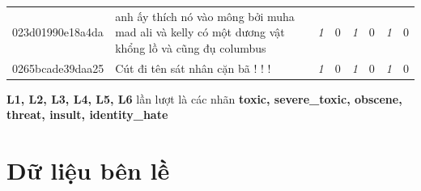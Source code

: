 \begin{table}[htb!]
{\begin{minipage}{0.88\textheight}
\begin{threeparttable}
\begin{tabularx}{\textwidth}{L{0.95} L{6.25} C{0.135} C{0.135} C{0.135} C{0.135} C{0.135} C{0.135}}
                    023d01990e18a4da & anh ấy thích nó vào mông bởi muha mad ali và kelly có một dương vật khổng lồ và cũng đụ columbus                                  & \textit{1}  & 0           & \textit{1}  & 0           & \textit{1}  & 0           \\
                    0265bcade39daa25 & Cút đi tên sát nhân cặn bã ! ! !                                                                                                  & \textit{1}  & 0           & \textit{1}  & 0           & \textit{1}  & 0           \\
                    \bottomrule
                \end{tabularx}
                \begin{tablenotes}
                    \fontsize{8pt}{12pt}\selectfont
                    \item \textbf{L1, L2, L3, L4, L5, L6} lần lượt là các nhãn \textbf{toxic, severe\_toxic, obscene, threat, insult, identity\_hate}
                \end{tablenotes}
            \end{threeparttable}
        \end{minipage}%
    }
\end{table}
\clearpage

\section{Dữ liệu bên lề}
